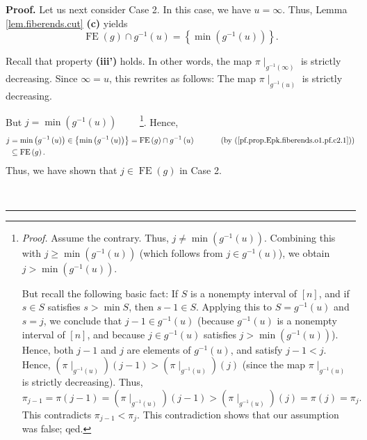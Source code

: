 \documentclass[numbers=enddot,12pt,final,onecolumn,notitlepage]{scrartcl}%
\theoremstyle{definition}
\newenvironment{proof}[1][Proof]{\noindent\textbf{#1.} }{\ \rule{0.5em}{0.5em}}
\newenvironment{verlong}{}{}
\begin{document}
\begin{verlong}
\begin{proof}
Let us next consider Case 2. In this case, we have $u=\infty$. Thus, Lemma
\ref{lem.fiberends.cut} \textbf{(c)} yields
\begin{equation}
\operatorname*{FE}\left(  g\right)  \cap g^{-1}\left(  u\right)  =\left\{
\min\left(  g^{-1}\left(  u\right)  \right)  \right\}  .
\label{pf.prop.Epk.fiberends.o1.pf.c2.1}%
\end{equation}


Recall that property \textbf{(iii')} holds. In other words, the map $\pi
\mid_{g^{-1}\left(  \infty\right)  }$ is strictly decreasing. Since $\infty
=u$, this rewrites as follows: The map $\pi\mid_{g^{-1}\left(  u\right)  }$ is
strictly decreasing.

But $j=\min\left(  g^{-1}\left(  u\right)  \right)  $%
\ \ \ \ \footnote{\textit{Proof.} Assume the contrary. Thus, $j\neq\min\left(
g^{-1}\left(  u\right)  \right)  $. Combining this with $j\geq\min\left(
g^{-1}\left(  u\right)  \right)  $ (which follows from $j\in g^{-1}\left(
u\right)  $), we obtain $j>\min\left(  g^{-1}\left(  u\right)  \right)  $.
\par
But recall the following basic fact: If $S$ is a nonempty interval of $\left[
n\right]  $, and if $s\in S$ satisfies $s>\min S$, then $s-1\in S$. Applying
this to $S=g^{-1}\left(  u\right)  $ and $s=j$, we conclude that $j-1\in
g^{-1}\left(  u\right)  $ (because $g^{-1}\left(  u\right)  $ is a nonempty
interval of $\left[  n\right]  $, and because $j\in g^{-1}\left(  u\right)  $
satisfies $j>\min\left(  g^{-1}\left(  u\right)  \right)  $). Hence, both
$j-1$ and $j$ are elements of $g^{-1}\left(  u\right)  $, and satisfy $j-1<j$.
Hence, $\left(  \pi\mid_{g^{-1}\left(  u\right)  }\right)  \left(  j-1\right)
>\left(  \pi\mid_{g^{-1}\left(  u\right)  }\right)  \left(  j\right)  $ (since
the map $\pi\mid_{g^{-1}\left(  u\right)  }$ is strictly decreasing). Thus,%
\[
\pi_{j-1}=\pi\left(  j-1\right)  =\left(  \pi\mid_{g^{-1}\left(  u\right)
}\right)  \left(  j-1\right)  >\left(  \pi\mid_{g^{-1}\left(  u\right)
}\right)  \left(  j\right)  =\pi\left(  j\right)  =\pi_{j}.
\]
This contradicts $\pi_{j-1}<\pi_{j}$. This contradiction shows that our
assumption was false; qed.}. Hence,%
\begin{align*}
j  &  =\min\left(  g^{-1}\left(  u\right)  \right)  \in\left\{  \min\left(
g^{-1}\left(  u\right)  \right)  \right\}  =\operatorname*{FE}\left(
g\right)  \cap g^{-1}\left(  u\right)  \ \ \ \ \ \ \ \ \ \ \left(  \text{by
(\ref{pf.prop.Epk.fiberends.o1.pf.c2.1})}\right) \\
&  \subseteq\operatorname*{FE}\left(  g\right)  .
\end{align*}
Thus, we have shown that $j\in\operatorname*{FE}\left(  g\right)  $ in Case 2.


\end{proof}
\end{verlong}
\end{document}
